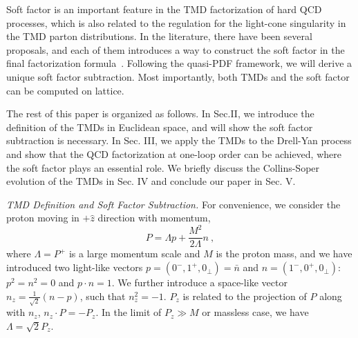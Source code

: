 \documentclass[aps,prd,preprint,tightenlines,superscriptaddress,nofootinbib]{revtex4}
\begin{document}
Soft factor is an important feature in the TMD factorization of hard QCD processes, 
which is also related to the regulation 
for the light-cone singularity in the TMD parton distributions. In the literature,
there have been several proposals, and each of them introduces a
way to construct the soft factor in the final factorization formula~\cite{Collins,Collins:1981uk,Ji:2004wu,bbdm}. 
Following the quasi-PDF framework, we will derive 
a unique soft factor subtraction.
Most importantly, both TMDs and the soft factor can be computed
on lattice.

The rest of this paper is organized as follows. In Sec.II, we introduce
the definition of the TMDs in Euclidean space, and will show the
soft factor subtraction is necessary. In Sec. III, we apply the TMDs
to the Drell-Yan process and show that the QCD factorization
at one-loop order can be achieved, where the soft factor plays an essential role. 
We briefly discuss the Collins-Soper
evolution of the TMDs in Sec. IV and conclude our paper in Sec. V.

{\it TMD Definition and Soft Factor Subtraction.}
For convenience, we consider the proton moving in $+\hat z$ direction with momentum,
\begin{equation}
P=\Lambda p+\frac{M^2}{2\Lambda}n \ ,
\end{equation}
where $\Lambda=P^+$ is a large momentum scale and $M$ is the proton mass, and we have introduced
two light-like vectors $p=(0^-,1^+,0_\perp)=\bar n$ and $n=(1^-,0^+,0_\perp)$:
$p^2=n^2=0$ and $p\cdot n=1$.
We further introduce a space-like vector $n_z=\frac{1}{\sqrt{2}}\left(n-p\right)$, such that
$n_z^2=-1$. $P_z$ is related to the projection of $P$ along with $n_z$,
$n_z\cdot P=-P_z $.
In the limit of $P_z\gg M$ or massless case, we have $\Lambda=\sqrt{2}P_z$.
\end{document}
